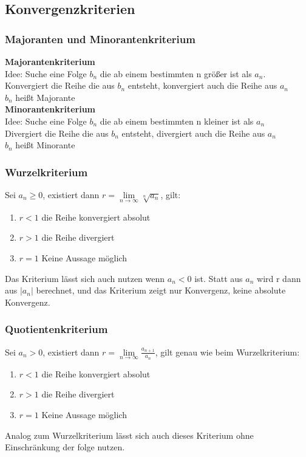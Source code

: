 \documentclass[12pt,a4paper]{article}
\begin{document}
\subsection{Konvergenzkriterien}
\subsubsection{Majoranten und Minorantenkriterium}
\textbf{Majorantenkriterium}\\
Idee: Suche eine Folge $b_n$ die ab einem bestimmten n größer ist als $a_n$.\\
Konvergiert die Reihe die aus $b_n$ entsteht, konvergiert auch die Reihe aus $a_n$\\
$b_n$ heißt Majorante\\
\textbf{Minorantenkriterium}\\
Idee: Suche eine Folge $b_n$ die ab einem bestimmten n kleiner ist als $a_n$\\
Divergiert die Reihe die aus $b_n$ entsteht, divergiert auch die Reihe aus $a_n$\\
$b_n$ heißt Minorante\\

\subsubsection{Wurzelkriterium}
Sei $a_n\geq 0$, existiert dann $r = \lim\limits_{n\rightarrow\infty} \sqrt[n]{a_n}$, gilt:
\begin{enumerate}
	\item $r<1$		die Reihe konvergiert absolut
	\item $r>1$		die Reihe divergiert
	\item $r=1$		Keine Aussage möglich
\end{enumerate}
Das Kriterium lässt sich auch nutzen wenn $a_n<0$ ist. Statt aus $a_n$ wird r dann aus $|a_n|$ berechnet, und das Kriterium zeigt nur Konvergenz, keine absolute Konvergenz.

\subsubsection{Quotientenkriterium}
Sei $a_n> 0$, existiert dann $r = \lim\limits_{n\rightarrow\infty} \frac{a_{n+1}}{a_n}$, gilt genau wie beim Wurzelkriterium:
\begin{enumerate}
	\item $r<1$		die Reihe konvergiert absolut
	\item $r>1$		die Reihe divergiert
	\item $r=1$		Keine Aussage möglich
\end{enumerate}
Analog zum Wurzelkriterium lässt sich auch dieses Kriterium ohne Einschränkung der folge nutzen.
\end{document}
